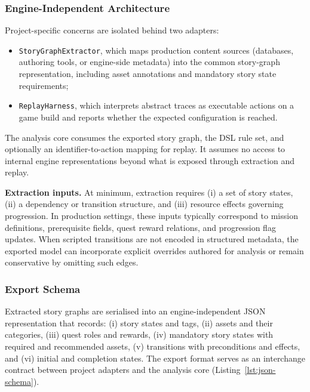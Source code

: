 \documentclass[conference]{IEEEtran}
\begin{document}
\subsubsection{Engine-Independent Architecture}
\label{sec:architecture}

Project-specific concerns are isolated behind two adapters:

\begin{itemize}[leftmargin=1.3em]
  \item \texttt{StoryGraphExtractor}, which maps production content
        sources (databases, authoring tools, or engine-side metadata)
        into the common story-graph representation, including asset
        annotations and mandatory story state requirements;
  \item \texttt{ReplayHarness}, which interprets abstract traces as
        executable actions on a game build and reports whether the
        expected configuration is reached.
\end{itemize}

The analysis core consumes the exported story graph, the DSL rule set,
and optionally an identifier-to-action mapping for replay. It assumes no
access to internal engine representations beyond what is exposed through
extraction and replay.

\noindent\textbf{Extraction inputs.}
At minimum, extraction requires (i) a set of story states, (ii) a
dependency or transition structure, and (iii) resource effects governing
progression. In production settings, these inputs typically correspond
to mission definitions, prerequisite fields, quest reward relations, and
progression flag updates. When scripted transitions are not encoded in
structured metadata, the exported model can incorporate explicit
overrides authored for analysis or remain conservative by omitting such
edges.

\subsubsection{Export Schema}
\label{sec:export-schema}

Extracted story graphs are serialised into an engine-independent JSON
representation that records: (i) story states and tags, (ii) assets and
their categories, (iii) quest roles and rewards, (iv) mandatory story
states with required and recommended assets, (v) transitions with
preconditions and effects, and (vi) initial and completion states. The
export format serves as an interchange contract between project adapters
and the analysis core (Listing~\ref{lst:json-schema}).
\end{document}
